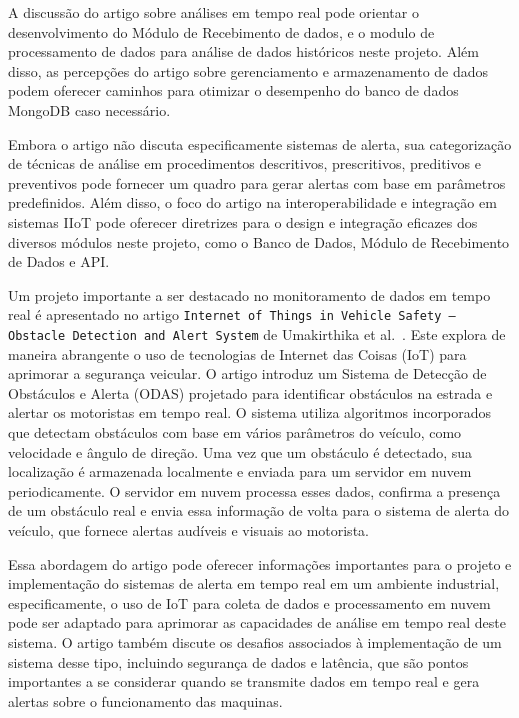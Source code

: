 A discussão do artigo sobre análises em tempo real pode orientar o desenvolvimento do Módulo de Recebimento de dados, e o modulo de processamento de dados para análise de dados históricos neste projeto. Além disso, as percepções do artigo sobre gerenciamento e armazenamento de dados podem oferecer caminhos para otimizar o desempenho do banco de dados MongoDB caso necessário.

Embora o artigo não discuta especificamente sistemas de alerta, sua categorização de técnicas de análise em procedimentos descritivos, prescritivos, preditivos e preventivos pode fornecer um quadro para gerar alertas com base em parâmetros predefinidos. Além disso, o foco do artigo na interoperabilidade e integração em sistemas IIoT pode oferecer diretrizes para o design e integração eficazes dos diversos módulos neste projeto, como o Banco de Dados, Módulo de Recebimento de Dados e API.

Um projeto importante a ser destacado no monitoramento de dados em tempo real é apresentado no artigo \texttt{Internet of Things in Vehicle Safety – Obstacle Detection and Alert System} de Umakirthika et al.~\cite{Umakirthika2018}. Este explora de maneira abrangente o uso de tecnologias de Internet das Coisas (IoT) para aprimorar a segurança veicular. O artigo introduz um Sistema de Detecção de Obstáculos e Alerta (ODAS) projetado para identificar obstáculos na estrada e alertar os motoristas em tempo real. O sistema utiliza algoritmos incorporados que detectam obstáculos com base em vários parâmetros do veículo, como velocidade e ângulo de direção. Uma vez que um obstáculo é detectado, sua localização é armazenada localmente e enviada para um servidor em nuvem periodicamente. O servidor em nuvem processa esses dados, confirma a presença de um obstáculo real e envia essa informação de volta para o sistema de alerta do veículo, que fornece alertas audíveis e visuais ao motorista.

Essa abordagem do artigo pode oferecer informações importantes para o projeto e implementação do sistemas de alerta em tempo real em um ambiente industrial, especificamente, o uso de IoT para coleta de dados e processamento em nuvem pode ser adaptado para aprimorar as capacidades de análise em tempo real deste sistema. O artigo também discute os desafios associados à implementação de um sistema desse tipo, incluindo segurança de dados e latência, que são pontos importantes a se considerar quando se transmite dados em tempo real e gera alertas sobre o funcionamento das maquinas.

